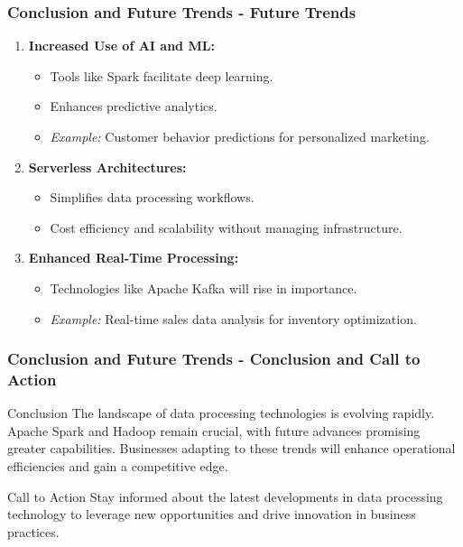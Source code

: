 \documentclass{beamer}
\begin{document}
\begin{frame}[fragile]
    \frametitle{Conclusion and Future Trends - Future Trends}
    \begin{enumerate}
        \item \textbf{Increased Use of AI and ML:}
        \begin{itemize}
            \item Tools like Spark facilitate deep learning.
            \item Enhances predictive analytics.
            \item \textit{Example:} Customer behavior predictions for personalized marketing.
        \end{itemize}

        \item \textbf{Serverless Architectures:}
        \begin{itemize}
            \item Simplifies data processing workflows.
            \item Cost efficiency and scalability without managing infrastructure.
        \end{itemize}

        \item \textbf{Enhanced Real-Time Processing:}
        \begin{itemize}
            \item Technologies like Apache Kafka will rise in importance.
            \item \textit{Example:} Real-time sales data analysis for inventory optimization.
        \end{itemize}
    \end{enumerate}
\end{frame}

\begin{frame}[fragile]
    \frametitle{Conclusion and Future Trends - Conclusion and Call to Action}
    \begin{block}{Conclusion}
        The landscape of data processing technologies is evolving rapidly. Apache Spark and Hadoop remain crucial, with future advances promising greater capabilities. Businesses adapting to these trends will enhance operational efficiencies and gain a competitive edge.
    \end{block}

    \begin{block}{Call to Action}
        Stay informed about the latest developments in data processing technology to leverage new opportunities and drive innovation in business practices.
    \end{block}
\end{frame}
\end{document}
